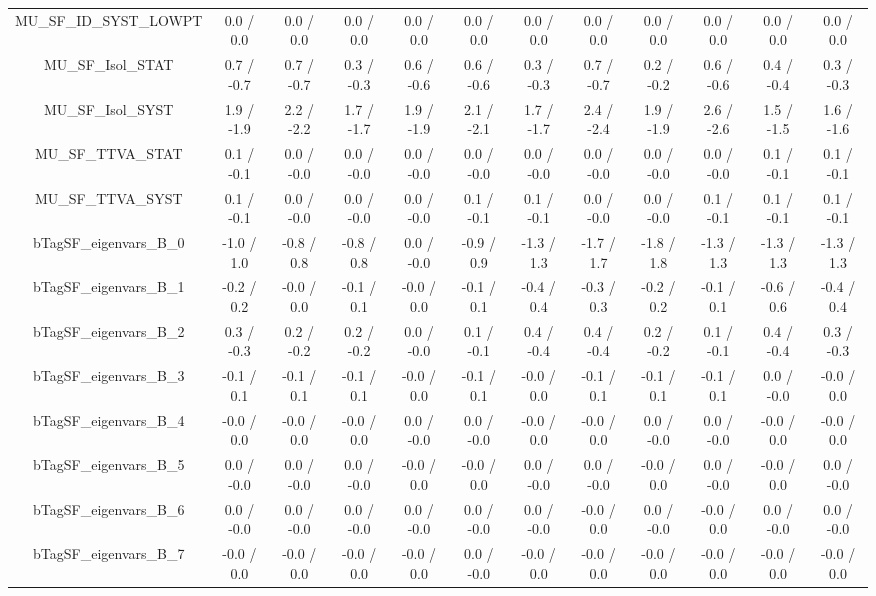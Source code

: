 \begin{table}[htbp]
\begin{center}
\begin{tabular}{|c|c|c|c|c|c|c|c|c|c|c|c|}
  MU_SF_ID_SYST_LOWPT & 0.0 / 0.0 & 0.0 / 0.0 & 0.0 / 0.0 & 0.0 / 0.0 & 0.0 / 0.0 & 0.0 / 0.0 & 0.0 / 0.0 & 0.0 / 0.0 & 0.0 / 0.0 & 0.0 / 0.0 & 0.0 / 0.0 \\ 
  MU_SF_Isol_STAT & 0.7 / -0.7 & 0.7 / -0.7 & 0.3 / -0.3 & 0.6 / -0.6 & 0.6 / -0.6 & 0.3 / -0.3 & 0.7 / -0.7 & 0.2 / -0.2 & 0.6 / -0.6 & 0.4 / -0.4 & 0.3 / -0.3 \\ 
  MU_SF_Isol_SYST & 1.9 / -1.9 & 2.2 / -2.2 & 1.7 / -1.7 & 1.9 / -1.9 & 2.1 / -2.1 & 1.7 / -1.7 & 2.4 / -2.4 & 1.9 / -1.9 & 2.6 / -2.6 & 1.5 / -1.5 & 1.6 / -1.6 \\ 
  MU_SF_TTVA_STAT & 0.1 / -0.1 & 0.0 / -0.0 & 0.0 / -0.0 & 0.0 / -0.0 & 0.0 / -0.0 & 0.0 / -0.0 & 0.0 / -0.0 & 0.0 / -0.0 & 0.0 / -0.0 & 0.1 / -0.1 & 0.1 / -0.1 \\ 
  MU_SF_TTVA_SYST & 0.1 / -0.1 & 0.0 / -0.0 & 0.0 / -0.0 & 0.0 / -0.0 & 0.1 / -0.1 & 0.1 / -0.1 & 0.0 / -0.0 & 0.0 / -0.0 & 0.1 / -0.1 & 0.1 / -0.1 & 0.1 / -0.1 \\ 
  bTagSF_eigenvars_B_0 & -1.0 / 1.0 & -0.8 / 0.8 & -0.8 / 0.8 & 0.0 / -0.0 & -0.9 / 0.9 & -1.3 / 1.3 & -1.7 / 1.7 & -1.8 / 1.8 & -1.3 / 1.3 & -1.3 / 1.3 & -1.3 / 1.3 \\ 
  bTagSF_eigenvars_B_1 & -0.2 / 0.2 & -0.0 / 0.0 & -0.1 / 0.1 & -0.0 / 0.0 & -0.1 / 0.1 & -0.4 / 0.4 & -0.3 / 0.3 & -0.2 / 0.2 & -0.1 / 0.1 & -0.6 / 0.6 & -0.4 / 0.4 \\ 
  bTagSF_eigenvars_B_2 & 0.3 / -0.3 & 0.2 / -0.2 & 0.2 / -0.2 & 0.0 / -0.0 & 0.1 / -0.1 & 0.4 / -0.4 & 0.4 / -0.4 & 0.2 / -0.2 & 0.1 / -0.1 & 0.4 / -0.4 & 0.3 / -0.3 \\ 
  bTagSF_eigenvars_B_3 & -0.1 / 0.1 & -0.1 / 0.1 & -0.1 / 0.1 & -0.0 / 0.0 & -0.1 / 0.1 & -0.0 / 0.0 & -0.1 / 0.1 & -0.1 / 0.1 & -0.1 / 0.1 & 0.0 / -0.0 & -0.0 / 0.0 \\ 
  bTagSF_eigenvars_B_4 & -0.0 / 0.0 & -0.0 / 0.0 & -0.0 / 0.0 & 0.0 / -0.0 & 0.0 / -0.0 & -0.0 / 0.0 & -0.0 / 0.0 & 0.0 / -0.0 & 0.0 / -0.0 & -0.0 / 0.0 & -0.0 / 0.0 \\ 
  bTagSF_eigenvars_B_5 & 0.0 / -0.0 & 0.0 / -0.0 & 0.0 / -0.0 & -0.0 / 0.0 & -0.0 / 0.0 & 0.0 / -0.0 & 0.0 / -0.0 & -0.0 / 0.0 & 0.0 / -0.0 & -0.0 / 0.0 & 0.0 / -0.0 \\ 
  bTagSF_eigenvars_B_6 & 0.0 / -0.0 & 0.0 / -0.0 & 0.0 / -0.0 & 0.0 / -0.0 & 0.0 / -0.0 & 0.0 / -0.0 & -0.0 / 0.0 & 0.0 / -0.0 & -0.0 / 0.0 & 0.0 / -0.0 & 0.0 / -0.0 \\ 
  bTagSF_eigenvars_B_7 & -0.0 / 0.0 & -0.0 / 0.0 & -0.0 / 0.0 & -0.0 / 0.0 & 0.0 / -0.0 & -0.0 / 0.0 & -0.0 / 0.0 & -0.0 / 0.0 & -0.0 / 0.0 & -0.0 / 0.0 & -0.0 / 0.0 \\ 

\end{tabular}
\end{center}
\end{table}
